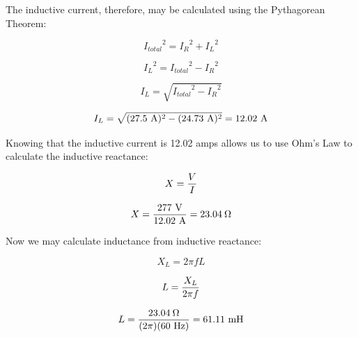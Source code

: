 The inductive current, therefore, may be calculated using the Pythagorean Theorem:

$${I_{total}}^2 = {I_R}^2 + {I_L}^2$$

$${I_L}^2 = {I_{total}}^2 - {I_R}^2$$

$$I_L = \sqrt{{I_{total}}^2 - {I_R}^2}$$

$$I_L = \sqrt{(27.5 \hbox{ A})^2 - (24.73 \hbox{ A})^2} = 12.02 \hbox{ A}$$

\vskip 10pt

Knowing that the inductive current is 12.02 amps allows us to use Ohm's Law to calculate the inductive reactance:

$$X = {V \over I}$$

$$X = {277 \hbox{ V} \over 12.02 \hbox{ A}} = 23.04 \> \Omega$$

\vskip 10pt

Now we may calculate inductance from inductive reactance:

$$X_L = 2 \pi f L$$

$$L = {X_L \over 2 \pi f}$$

$$L = {23.04 \> \Omega \over (2 \pi) (60 \hbox{ Hz})} = 61.11 \hbox{ mH}$$




